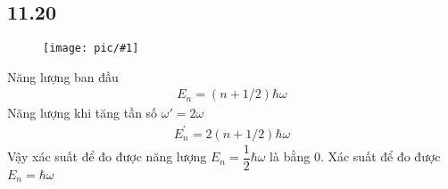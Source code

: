 \documentclass{article}
\newcommand{\image}[1]{
	\begin{figure}[H]
		\centering
		\texttt{[image: pic/\#1]}
		\label{#1}
	\end{figure}
}
\newcommand{\f}[2]{\dfrac{#1}{#2}}
\begin{document}
\subsection*{11.20}
\image{11.19.png}
Năng lượng ban đầu 
\begin{gather*}
	E_{n} = (n + 1/2) \hbar \omega
\end{gather*}
Năng lượng khi tăng tần số $\omega' = 2 \omega$
\begin{gather*}
	E_{n}^{'} = 2(n + 1/2) \hbar \omega
\end{gather*}
Vậy xác suất để đo được năng lượng $E_{n} = \f{1}{2}\hbar \omega$ là bằng 0. Xác suất để đo được $E_{n} = \hbar \omega$
\end{document}
